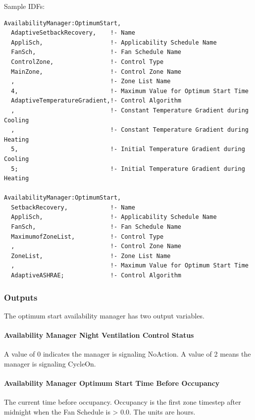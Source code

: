 Sample IDFs:

\begin{lstlisting}
AvailabilityManager:OptimumStart,
  AdaptiveSetbackRecovery,    !- Name
  AppliSch,                   !- Applicability Schedule Name
  FanSch,                     !- Fan Schedule Name
  ControlZone,                !- Control Type
  MainZone,                   !- Control Zone Name
  ,                           !- Zone List Name
  4,                          !- Maximum Value for Optimum Start Time
  AdaptiveTemperatureGradient,!- Control Algorithm
  ,                           !- Constant Temperature Gradient during Cooling
  ,                           !- Constant Temperature Gradient during Heating
  5,                          !- Initial Temperature Gradient during Cooling
  5;                          !- Initial Temperature Gradient during Heating

AvailabilityManager:OptimumStart,
  SetbackRecovery,            !- Name
  AppliSch,                   !- Applicability Schedule Name
  FanSch,                     !- Fan Schedule Name
  MaximumofZoneList,          !- Control Type
  ,                           !- Control Zone Name
  ZoneList,                   !- Zone List Name
  ,                           !- Maximum Value for Optimum Start Time
  AdaptiveASHRAE;             !- Control Algorithm
\end{lstlisting}

\subsubsection{Outputs}\label{outputs-10-007}

The optimum start availability manager has two output variables.

\paragraph{Availability Manager Night Ventilation Control Status}\label{availability-manager-night-ventilation-control-status-1}

A value of 0 indicates the manager is signaling NoAction. A value of 2 means the manager is signaling CycleOn.

\paragraph{Availability Manager Optimum Start Time Before Occupancy}\label{availability-manager-optimum-start-time-before-occupancy}

The current time before occupancy. Occupancy is the first zone timestep after midnight when the Fan Schedule is \textgreater{} 0.0. The units are hours.
